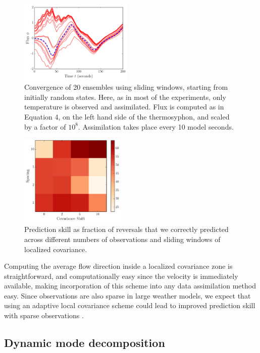 \begin{figure}[h]
  \centering
  \includegraphics[width=0.48\textwidth]{../figures/2015-10-12-09-36-loop-spaghetti.pdf}
  \caption[]{
    Convergence of 20 ensembles using sliding windows, starting from initially random states.
    Here, as in most of the experiments, only temperature is observed and assimilated.
    Flux is computed as in Equation 4, on the left hand side of the thermosyphon, and scaled by a factor of $10^8$.
    Assimilation takes place every 10 model seconds.
  }
  \label{fig:sliding_spag}
\end{figure}

\begin{figure}[h]
  \centering
  \includegraphics[width=0.45\textwidth]{../figures/2015-09-30-19-59-consuela-2.pdf}
  \caption[]{
    Prediction skill as fraction of reversals that we correctly predicted across different numbers of observations and sliding windows of localized covariance.
  }
  \label{fig:sliding_results}
\end{figure}

Computing the average flow direction inside a localized covariance zone is straightforward, and computationally easy since the velocity is immediately available, making incorporation of this scheme into any data assimilation method easy.
Since observations are also sparse in large weather models, we expect that using an adaptive local covariance scheme could lead to improved prediction skill with sparse observations \cite{bishop2011a}.

\subsection{Dynamic mode decomposition}

